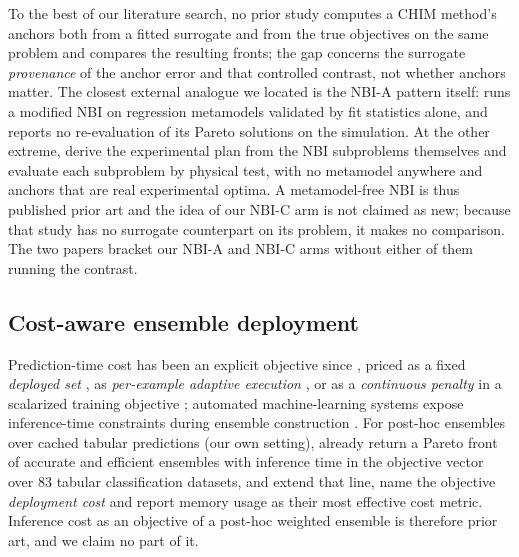 To the best of our literature search, no prior study computes a CHIM method's anchors both from a fitted surrogate
and from the true objectives on the same problem and compares the resulting fronts; the gap concerns the surrogate
\emph{provenance} of the anchor error and that controlled contrast, not whether anchors matter. The closest external
analogue we located is the NBI-A pattern itself: \citet{abolghasemian2022haulage} runs a modified NBI on regression
metamodels validated by fit statistics alone, and reports no re-evaluation of its Pareto solutions on the simulation. At the other
extreme, \citet{gellerich2023doenbi} derive the experimental plan from the NBI subproblems themselves and evaluate each
subproblem by physical test, with no metamodel anywhere and anchors that are real experimental optima. A metamodel-free
NBI is thus published prior art and the idea of our NBI-C arm is not claimed as new; because that study has no
surrogate counterpart on its problem, it makes no comparison. The two papers bracket our NBI-A and NBI-C arms without
either of them running the contrast.

\subsection{Cost-aware ensemble deployment}
\label{sec:rel:cost}

Prediction-time cost has been an explicit objective since \citet{turney2000types}, priced as a fixed \emph{deployed
set} \citep{zhou2002ensembling,ji2023pruning,maier2024hardware,maier2026hapens,gunasekaran2022cocktail,moreira2026energy},
as \emph{per-example adaptive execution}
\citep{xu2013cstc,trapeznikov2013multistage,nan2017adaptive,chen2020frugalml}, or as a \emph{continuous penalty} in a
scalarized training objective \citep{xu2012greedy,zhang2011sparse}; automated machine-learning systems expose
inference-time constraints during ensemble construction
\citep{erickson2020autogluon,feurer2022autosklearn,borchert2022paretoselect}. For post-hoc ensembles over cached
tabular predictions (our own setting), \citet{maier2024hardware} already return a Pareto front of accurate and
efficient ensembles with inference time in the objective vector over 83 tabular classification datasets, and
\citet{maier2026hapens} extend that line, name the objective \emph{deployment cost} and report memory usage as their
most effective cost metric. Inference cost as an objective of a post-hoc weighted ensemble is therefore prior art, and
we claim no part of it.

